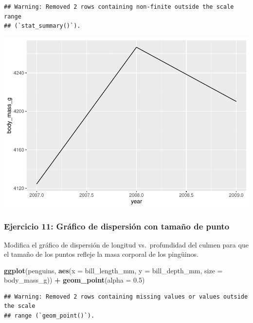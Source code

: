 \documentclass[
]{book}
\newenvironment{Shaded}{\begin{snugshade}}{\end{snugshade}}
\newcommand{\AttributeTok}[1]{\textcolor[rgb]{0.13,0.29,0.53}{#1}}
\newcommand{\FloatTok}[1]{\textcolor[rgb]{0.00,0.00,0.81}{#1}}
\newcommand{\FunctionTok}[1]{\textcolor[rgb]{0.13,0.29,0.53}{\textbf{#1}}}
\newcommand{\NormalTok}[1]{#1}
\newcommand{\SpecialCharTok}[1]{\textcolor[rgb]{0.81,0.36,0.00}{\textbf{#1}}}
\begin{document}
\begin{verbatim}
## Warning: Removed 2 rows containing non-finite outside the scale range
## (`stat_summary()`).
\end{verbatim}

\includegraphics{bookdown-demo_files/figure-latex/unnamed-chunk-190-1.pdf}

\subsubsection{Ejercicio 11: Gráfico de dispersión con tamaño de punto}\label{ejercicio-11-gruxe1fico-de-dispersiuxf3n-con-tamauxf1o-de-punto}

Modifica el gráfico de dispersión de longitud vs.~profundidad del culmen para que el tamaño de los puntos refleje la masa corporal de los pingüinos.

\begin{Shaded}
\begin{Highlighting}[]
\FunctionTok{ggplot}\NormalTok{(penguins, }\FunctionTok{aes}\NormalTok{(}\AttributeTok{x =}\NormalTok{ bill\_length\_mm, }\AttributeTok{y =}\NormalTok{ bill\_depth\_mm, }\AttributeTok{size =}\NormalTok{ body\_mass\_g)) }\SpecialCharTok{+}
  \FunctionTok{geom\_point}\NormalTok{(}\AttributeTok{alpha =} \FloatTok{0.5}\NormalTok{)}
\end{Highlighting}
\end{Shaded}

\begin{verbatim}
## Warning: Removed 2 rows containing missing values or values outside the scale
## range (`geom_point()`).
\end{verbatim}
\end{document}
